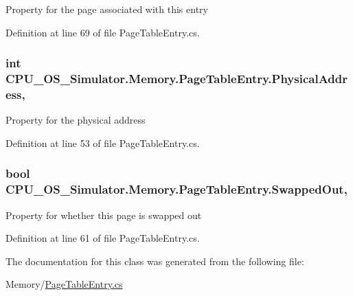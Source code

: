 Property for the page associated with this entry 



Definition at line 69 of file Page\+Table\+Entry.\+cs.

\hypertarget{class_c_p_u___o_s___simulator_1_1_memory_1_1_page_table_entry_ab52b7572557f81a63006101b4b348f8f}{}
\subsubsection[{Physical\+Address}]{\setlength{\rightskip}{0pt plus 5cm}int C\+P\+U\+\_\+\+O\+S\+\_\+\+Simulator.\+Memory.\+Page\+Table\+Entry.\+Physical\+Address\hspace{0.3cm}{\ttfamily [get]}, {\ttfamily [set]}}\label{class_c_p_u___o_s___simulator_1_1_memory_1_1_page_table_entry_ab52b7572557f81a63006101b4b348f8f}


Property for the physical address 



Definition at line 53 of file Page\+Table\+Entry.\+cs.

\hypertarget{class_c_p_u___o_s___simulator_1_1_memory_1_1_page_table_entry_a334eb63f388b19d1cf6907970f29e204}{}
\subsubsection[{Swapped\+Out}]{\setlength{\rightskip}{0pt plus 5cm}bool C\+P\+U\+\_\+\+O\+S\+\_\+\+Simulator.\+Memory.\+Page\+Table\+Entry.\+Swapped\+Out\hspace{0.3cm}{\ttfamily [get]}, {\ttfamily [set]}}\label{class_c_p_u___o_s___simulator_1_1_memory_1_1_page_table_entry_a334eb63f388b19d1cf6907970f29e204}


Property for whether this page is swapped out 



Definition at line 61 of file Page\+Table\+Entry.\+cs.



The documentation for this class was generated from the following file\+:\begin{DoxyCompactItemize}
\item 
Memory/\hyperlink{_page_table_entry_8cs}{Page\+Table\+Entry.\+cs}\end{DoxyCompactItemize}
